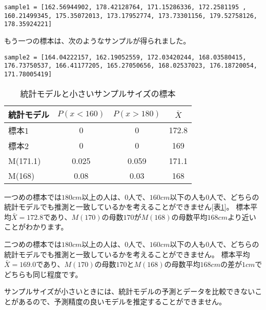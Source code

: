 \documentclass[a4paper,11pt,dvipdfmx]{jsarticle}
\begin{document}
\begin{lstlisting}
sample1 = [162.56944902, 178.42128764, 171.15286336, 172.2581195 , 160.21499345, 175.35072013, 173.17952774, 173.73301156, 179.52758126, 178.35924221]
\end{lstlisting}


もう一つの標本は、次のようなサンプルが得られました。
\begin{lstlisting}
sample2 = [164.04222157, 162.19052559, 172.03420244, 168.03580415, 176.73750537, 166.41177205, 165.27050656, 168.02537023, 176.18720054, 171.78005419]
\end{lstlisting}


\begin{table}[hbtp]
    \caption{統計モデルと小さいサンプルサイズの標本}
    \label{table:smalle_sample_size}
    \centering
    \begin{tabular}{lccc}
    統計モデル  & $P(x<160)$  & $P(x>180)$  & $\bar{X}$ \\
    \hline \hline
    標本1 &  0 &  0 & 172.8 \\
    標本2 &  0 &  0 & 169 \\
    M(171.1) & 0.025 & 0.059  & 171.1 \\
    M(168) &  0.08 & 0.03 & 168\\
      \hline
    \end{tabular}
  \end{table}
一つめの標本では$180cm$以上の人は、$0$人で、$160cm$以下の人も$0$人で、どちらの統計モデルでも推測と一致しているかを考えることができません[表\ref{table:smalle_sample_size}]。
標本平均$\bar{X}=172.8$であり、$M(170)$の母数$170$が$M(168)$の母数平均$168cm$より近いことがわかります。

二つめの標本では$180cm$以上の人は、$0$人で、$160cm$以下の人も$0$人で、どちらの統計モデルでも推測と一致しているかを考えることができません。
標本平均$\bar{X}=169.0$であり、$M(170)$の母数$170$と$M(168)$の母数平均$168cm$の差が$1cm$でどちらも同じ程度です。

サンプルサイズが小さいときには、統計モデルの予測とデータを比較できないことがあるので、予測精度の良いモデルを推定することができません。


\end{document}
